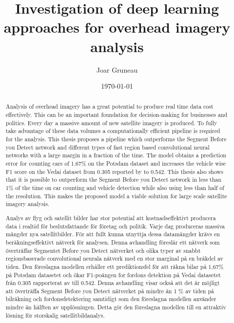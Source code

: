 \documentclass{kththesis}
\title{Investigation of deep learning approaches for overhead imagery analysis}
\author{Joar Gruneau}
\date{\today}
\begin{document}
\frontmatter

\titlepage

\begin{abstract}
Analysis of overhead imagery has a great potential to produce real time data cost effectively. This can be an important foundation for decision-making for businesses and politics. Every day a massive amount of new satellite imagery is produced. To fully take advantage of these data volumes a computationally efficient pipeline is required for the analysis. This thesis proposes a pipeline which outperforms the Segment Before you Detect network \parencite{audebert_usability_2016} and different types of fast region based convolutional neural networks \parencite{zhong_robust_2017-1} with a large margin in a fraction of the time. The model obtains a prediction error for counting cars of 1.67\% on the Potsdam dataset and increases the vehicle wise F1 score on the Vedai dataset from 0.305 reported by \parencite{zhong_robust_2017-1} to 0.542. This thesis also shows that it is possible to outperform the  Segment Before you Detect network in less than 1\% of the time on car counting and vehicle detection while also using less than half of the resolution. This makes the proposed model a viable solution for large scale satellite imagery analysis.
\end{abstract}


\begin{otherlanguage}{swedish}
  \begin{abstract}
Analys av flyg och satellit bilder har stor potential att kostnadseffektivt producera data i realtid  för beslutsfattande för företag och politik. Varje dag produceras massiva mängder nya satellitbilder. För att fullt kunna utnyttja dessa datamängder krävs en beräkningseffektivt nätverk för analysen. Denna avhandling föreslår ett nätverk som överträffar Segmentet Before you Detect nätverket  \parencite{audebert_usability_2016} och olika typer av snabbt regionsbaserade convolutional neurala nätverk \parencite{zhong_robust_2017-1} med en stor marginal på en bråkdel av tiden. Den föreslagna modellen erhåller ett prediktionsfel för att räkna bilar på 1,67\% på Potsdam datasetet och ökar F1-poängen for fordons detektion på Vedai datasetet från 0.305 rapporterat av \parencite{zhong_robust_2017-1} till 0.542. Denna avhandling visar också att det är möjligt att överträffa Segment Before you Detect nätverket på mindre än 1 \% av tiden på bilräkning och fordonsdetektering samtidigt som den föreslagna modellen använder mindre än hälften av upplösningen. Detta gör den föreslagna modellen till en attraktiv lösning för storskalig satellitbildanalys.
  \end{abstract}
\end{otherlanguage}
\end{document}
